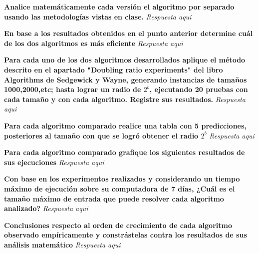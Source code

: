 \documentclass{article}
\begin{document}
\begin{question}
  \textbf{Analice matemáticamente cada versión el algoritmo por separado usando las metodologías vistas en clase.}
  \textit{Respuesta aqui}
\end{question}

\begin{question}
  \textbf{En base a los resultados obtenidos en el punto anterior determine cuál de los dos algoritmos es más eficiente}
  \textit{Respuesta aqui}
\end{question}

\begin{question}
  \textbf{Para cada uno de los dos algoritmos desarrollados aplique el método descrito en el apartado "Doubling ratio experiments" del libro Algorithms de Sedgewick y Wayne, generando instancias de tamaños 1000,2000,etc; hasta lograr un radio de $2^{b}$, ejecutando 20 pruebas con cada tamaño y con cada algoritmo. Registre sus resultados.}
  \textit{Respuesta aqui}
\end{question}

\begin{question}
  \textbf{Para cada algoritmo comparado realice una tabla con 5 predicciones, posteriores al tamaño con que se logró obtener el radio $2^{b}$}
  \textit{Respuesta aqui}
\end{question}

\begin{question}
  \textbf{Para cada algoritmo comparado grafique los siguientes resultados de sus ejecuciones}
  \textit{Respuesta aqui}
\end{question}

\begin{question}
  \textbf{Con base en los experimentos realizados y considerando un tiempo máximo de ejecución sobre su computadora de 7 días, ¿Cuál es el tamaño máximo de entrada que puede resolver cada algoritmo analizado?}
  \textit{Respuesta aqui}
\end{question}

\begin{question}
  \textbf{Conclusiones respecto al orden de crecimiento de cada algoritmo observado empíricamente y constrástelas contra los resultados de sus análisis matemático}
  \textit{Respuesta aqui}
\end{question}
\end{document}
